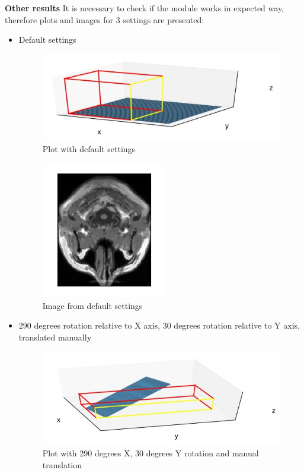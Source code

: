 \textbf{Other results}
\newline\indent It is necessary to check if the module works in expected way, therefore plots and images for 3 settings are presented:
\begin{itemize}
\item Default settings
\begin{figure}[H]
\centering{}\includegraphics[scale=0.7]{figures/module_12/mod120obl}\caption{Plot with default settings\label{fig:figures/module_12/Preprocessing}}
\end{figure}


\begin{figure}[H]
\centering{}\includegraphics[scale=0.7]{figures/module_12/mod120obli}\caption{Image from default settings\label{fig:figures/module_12/Preprocessing}}
\end{figure}
\item 290 degrees rotation relative to X axis, 30 degrees rotation relative to Y axis, translated manually
\begin{figure}[H]
\centering{}\includegraphics[scale=0.7]{figures/module_12/mod1229030}\caption{Plot with 290 degrees X, 30 degrees Y rotation and manual translation \label{fig:figures/module_12/Preprocessing}}
\end{figure}


\end{itemize}
